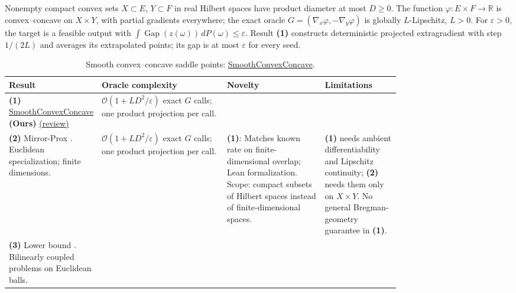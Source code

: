 \begin{table}[tp]
\centering
\caption{Smooth convex--concave saddle points: \href{https://github.com/k3nfalt/longtails/blob/main/LongTails/Setups/SmoothConvexConcave.lean}{SmoothConvexConcave}.}\label{tab:SmoothConvexConcave}
\parbox{\linewidth}{\footnotesize Nonempty compact convex sets $X\subset E$, $Y\subset F$ in real Hilbert spaces have product diameter at most $D\ge0$. The function $\varphi:E\times F\to\mathbb R$ is convex--concave on $X\times Y$, with partial gradients everywhere; the exact oracle $G=(\nabla_x\varphi,-\nabla_y\varphi)$ is globally $L$-Lipschitz, $L>0$. For $\varepsilon>0$, the target is a feasible output with $\int\operatorname{Gap}(z(\omega))\,dP(\omega)\le\varepsilon$. Result \textbf{(1)} constructs deterministic projected extragradient with step $1/(2L)$ and averages its extrapolated points; its gap is at most $\varepsilon$ for every seed.}\par\smallskip
\begin{threeparttable}
\footnotesize
\setlength{\tabcolsep}{4pt}\renewcommand{\arraystretch}{1.25}
\begin{tabularx}{\linewidth}{@{}>{\raggedright\arraybackslash}p{0.20\linewidth}>{\raggedright\arraybackslash}p{0.32\linewidth}>{\raggedright\arraybackslash}p{0.25\linewidth}>{\raggedright\arraybackslash}X@{}}
\toprule
\textbf{Result} & \textbf{Oracle complexity} & \textbf{Novelty} & \textbf{Limitations} \\
\midrule
\textbf{(1)} \href{https://github.com/k3nfalt/longtails/blob/main/LongTails/Theorems/SmoothConvexConcave.lean}{Smooth\allowbreak Convex\allowbreak Concave} \textbf{(Ours)} \href{https://github.com/k3nfalt/longtails/blob/main/scripts/reviews/SmoothConvexConcave.md}{(review)}
& $\mathcal{O}(1+LD^2/\varepsilon)$ exact $G$ calls; one product projection per call.
& & \\
\midrule[1.2pt]
\textbf{(2)} Mirror-Prox \citep[Thm.~3.2, (3.10)]{sccNemirovski2004}. Euclidean specialization; finite dimensions.
& $\mathcal{O}(1+LD^2/\varepsilon)$ exact $G$ calls; one product projection per call.
& \textbf{(1)}: Matches known rate on finite-dimensional overlap; Lean formalization. Scope: compact subsets of Hilbert spaces instead of finite-dimensional spaces.
& \textbf{(1)} needs ambient differentiability and Lipschitz continuity; \textbf{(2)} needs them only on $X\times Y$. No general Bregman-geometry guarantee in \textbf{(1)}. \\
\midrule
\textbf{(3)} Lower bound \citep[Thm.~9]{sccOuyangXu2018v1}. Bilinearly coupled problems on Euclidean balls.

\end{tabularx}
\end{threeparttable}
\end{table}

